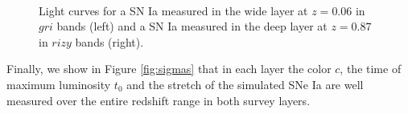 \documentclass[\docopts]{\docclass}
\begin{document}
\begin{figure}[t]
\begin{center}
\\
\caption{Light curves for a SN Ia measured in the wide layer at $z=0.06$ in $gri$ bands (left) and a SN Ia measured in the deep layer at $z=0.87$ in $rizy$ bands (right).}
\label{fig:lc_examples}
\end{center}
\end{figure}

Finally, we show in Figure \ref{fig:sigmas} that in each layer the color $c$, the time of maximum luminosity $t_0$ and the stretch of the simulated SNe Ia are well measured over the entire redshift range in both survey layers.
\end{document}
